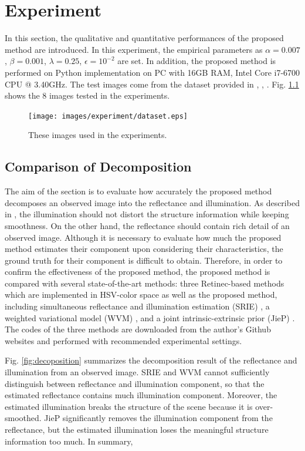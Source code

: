 \chapter{Experiment}
\label{sec:experiment}
In this section, the qualitative and quantitative performances of the proposed method are introduced. In this experiment, the empirical parameters as $\alpha=0.007$, $\beta=0.001$, $\lambda=0.25$, $\epsilon=10^{-2}$ are set. In addition, the proposed method is performed on Python implementation on PC with 16GB RAM, Intel Core i7-6700 CPU @ 3.40GHz. The test images come from the dataset provided in \cite{wvm}, \cite{rrm}, \cite{jiep}. Fig. \ref{fig:dataset} shows the 8 images tested in the experiments.
\begin{figure}[tb]
	\centering
	\texttt{[image: images/experiment/dataset.eps]}
	\caption{These images used in the experiments.} \label{fig:dataset}
\end{figure}

\section{Comparison of Decomposition} \label{sec:decomposition}
The aim of the section is to evaluate how accurately the proposed method decomposes an observed image into the reflectance and illumination. As described in \cite{retinex}, the illumination should not distort the structure information while keeping smoothness. On the other hand, the reflectance should contain rich detail of an observed image. Although it is necessary to evaluate how much the proposed method estimates their component upon considering their characteristics, the ground truth for their component is difficult to obtain. Therefore, in order to confirm the effectiveness of the proposed method, the proposed method is compared with several state-of-the-art methods: three Retinec-based methods which are implemented in HSV-color space as well as the proposed method, including simultaneous reflectance and illumination estimation (SRIE) \cite{srie}, a weighted variational model (WVM) \cite{wvm}, and a joint intrinsic-extrinsic prior (JieP) \cite{jiep}. The codes of the three methods are downloaded from the author's Github websites and performed with recommended experimental settings.\par
Fig. \ref{fig:decoposition} summarizes the decomposition result of the reflectance and illumination from an observed image. SRIE and WVM cannot sufficiently distinguish between reflectance and illumination component, so that the estimated reflectance contains much illumination component. Moreover, the estimated illumination breaks the structure of the scene because it is over-smoothed. JieP significantly removes the illumination component from the reflectance, but the estimated illumination loses the meaningful structure information too much. In summary, 

